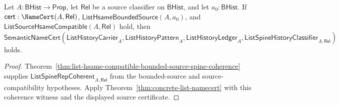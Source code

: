 \begin{corollary}
\label{thm:list-hsame-compatible-bounded-source-public-object-certificate}
Let $A:\mathsf{BHist}\to\mathsf{Prop}$, let $\mathsf{Rel}$ be a source
classifier on $\mathsf{BHist}$, and let $a_0:\mathsf{BHist}$. If
$\mathsf{cert}:\NameCert(A,\mathsf{Rel})$,
$\mathsf{ListHsameBoundedSource}(A,a_0)$, and
$\mathsf{ListSourceHsameCompatible}(A,\mathsf{Rel})$ hold, then
$$
\mathsf{SemanticNameCert}(\mathsf{ListHistoryCarrier}_A,
\mathsf{ListHistoryPattern}_A,
\mathsf{ListHistoryLedger}_A,
\mathsf{ListSpineHistoryClassifier}_{A,\mathsf{Rel}})
$$
holds.
\end{corollary}
\begin{proof}
Theorem~\ref{thm:list-hsame-compatible-bounded-source-spine-coherence} supplies
$\mathsf{ListSpineRepCoherent}_{A,\mathsf{Rel}}$ from the bounded-source and
source-compatibility hypotheses. Apply
Theorem~\ref{thm:concrete-list-namecert} with this coherence witness and the
displayed source certificate.
\end{proof}

